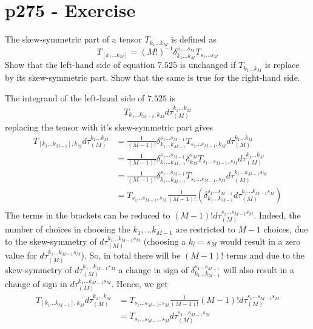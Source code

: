 \section{p275 - Exercise }
\begin{tcolorbox}
The skew-symmetric part of a tensor $T_{k_1\dots k_M}$ is defined as  
$$ T_{\left [k_1 \dots k_M\right ]}= \left(M!\right)^{-1}\delta_{k_1 \dots k_M}^{s_1 \dots s_M} T_{s_1\dots s_M}$$
Show that the left-hand side of equation $\mathbf{7.525}$ is unchanged if $T_{k_1\dots k_M}$ is replace by its skew-symmetric part. Show that the same is true for the right-hand side.
\end{tcolorbox}
The integrand of the left-hand side of $\mathbf{7.525}$ is
\begin{align}
T_{k_1\dots k_{M-1},k_M}d\tau_{(M)}^{k_1\dots k_M}
\end{align}
replacing the tensor with it's skew-symmetric part gives
\begin{align}
T_{\left [k_1 \dots k_{M-1}\right ],k_M}d\tau_{(M)}^{k_1\dots k_M}&= \frac{1}{\left(M-1\right)!}\delta_{k_1 \dots k_{M-1}}^{s_1 \dots s_{M-1}} T_{s_1\dots s_{M-1},k_M}d\tau_{(M)}^{k_1\dots k_M}\\
&= \frac{1}{\left(M-1\right)!}\delta_{k_1 \dots k_{M-1}}^{s_1 \dots s_{M-1}} \delta^{s_M}_{k_M}T_{s_1\dots s_{M-1},s_M}d\tau_{(M)}^{k_1\dots k_M}\\
&= \frac{1}{\left(M-1\right)!}\delta_{k_1 \dots k_{M-1}}^{s_1 \dots s_{M-1}} T_{s_1\dots s_{M-1},s_M}d\tau_{(M)}^{k_1\dots k_{M-1}s_M}\\
&=T_{s_1\dots s_{M-1},s_M} \frac{1}{\left(M-1\right)!}\left(\delta_{k_1 \dots k_{M-1}}^{s_1 \dots s_{M-1}} d\tau_{(M)}^{k_1\dots k_{M-1}s_M}\right)\\
\end{align}
The terms in the brackets can be reduced to $\left(M-1\right)! d\tau_{(M)}^{s_1\dots s_{M-1}s_M}$. Indeed, the number of choices in choosing the $k_1,\dots k_{M-1}$ are restricted to $M-1$ choices, due to the skew-symmetry of $d\tau_{(M)}^{k_1\dots k_{M-1}s_M}$ (choosing a $k_i= s_M$ would result in a zero value for $d\tau_{(M)}^{k_1\dots k_{M-1}s_M}$). So, in total there will be $ \left(M-1\right)!$ terms and due to the skew-symmetry of $d\tau_{(M)}^{k_1\dots k_{M-1}s_M}$  a change in sign of $\delta_{k_1 \dots k_{M-1}}^{s_1 \dots s_{M-1}}$ will also result in a change of sign in $d\tau_{(M)}^{k_1\dots k_{M-1}s_M}$.
Hence, we get 
\begin{align}
T_{\left [k_1 \dots k_{M-1}\right ],k_M}d\tau_{(M)}^{k_1\dots k_M}
&=T_{s_1\dots s_{M-1},s_M} \frac{1}{\left(M-1\right)!}\left(M-1\right)! d\tau_{(M)}^{s_1\dots s_{M-1}s_M}\\
&=T_{s_1\dots s_{M-1},s_M} d\tau_{(M)}^{s_1\dots s_{M-1}s_M}
\end{align}
